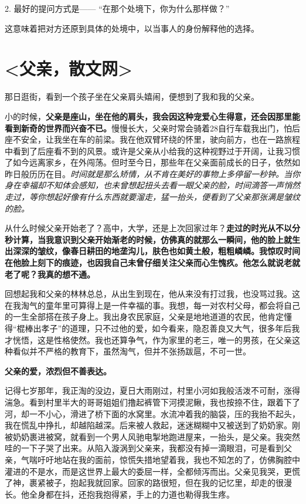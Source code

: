\documentclass[UTF8,a4paper,8pt]{ctexbook}
\begin{document}
		2. 最好的提问方式是——
		“在那个处境下，你为什么那样做？”
		
		这意味着把对方还原到具体的处境中，以当事人的身份解释他的选择。

\newpage
\section{<父亲，散文网>}
		那日逛街，看到一个孩子坐在父亲肩头嬉闹，便想到了我和我的父亲。
		
		小的时候，\textbf{父亲是座山，坐在他的肩头，我会因这种宠爱心生得意，还会因那里能看到新奇的世界而兴奋不已。}慢慢长大，父亲时常会骑着28自行车载我出门，怕后座不安全，让我坐在车的前梁。我在他双臂环绕的怀里，驶向前方，也在一路旅程中看到了后座看不到的风景。或许是父亲从小给我的这种视野过于开阔，让我习惯了如今远离家乡，在外闯荡。但时至今日，那些年在父亲面前成长的日子，依然如昨日般历历在目。\textit{时间就是那么矫情，从不肯在美好的事物上多停留一秒钟。当你身在幸福却不知体会感知，也未曾想起扭头去看一眼父亲的脸，时间滴答一声悄然走过，等你想起好像有什么东西就要溜走，猛一抬头，便看到了父亲那张满是皱纹的脸。}
		
		从什么时候父亲开始老了？高中，大学，还是上次回家过年？\textbf{走过的时光从不以分秒计算，当我意识到父亲开始渐老的时候，仿佛真的就那么一瞬间，他的脸上就生出深深的皱纹，像春日耕田的地垄沟儿，肤色也如黄土般，粗粗嶙嶙。我惊叹时间在他脸上刻下的痕迹，也因我自己未曾仔细关注父亲而心生愧疚。他怎么就说老就老了呢？我真的想不通。}
		
		回想起我和父亲的林林总总，从出生到现在，他从来没有打过我，也没骂过我。这在我淘气的童年里可算得上是一件幸福的事。我想，每一对农村父母，都会将自己的一生全部搭在孩子身上。我出身农民家庭，父亲是地地道道的农民，他肯定懂得“棍棒出孝子”的道理，只不过他的爱，如今看来，隐忍善良又大气，很多年后我才恍悟，这是性格使然。我也还算争气，作为家里的老三，唯一的男孩，在父亲这种看似并不严格的教育下，虽然淘气，但并不张扬跋扈，不可一世。
		
		\textbf{父亲的爱，浓烈但不善表达。}
		
		记得七岁那年，我正淘的没边，夏日大雨刚过，村里小河如我般活泼不可耐，涨得湍急。看到村里半大的哥哥姐姐们撸起裤管下河摸泥鳅，我也按捺不住，跟着下了河，却一不小心，滑进了桥下面的水窝里。水流冲着我的脑袋，压的我抬不起头，我在慌乱中挣扎，却越陷越深。后来被人救起，迷迷糊糊中又被送到了奶奶家。刚被奶奶裹进被窝，就看到一个男人风驰电掣地跑进屋来，一抬头，是父亲。我突然哇的一下子哭了出来。从陷入漩涡到父亲来，我都没有掉一滴眼泪，可是看到父亲，气喘吁吁地站在我的面前，惊慌失措地望着我，我也不知怎的了，仿佛胸腔中灌进的不是水，而是这世界上最大的委屈一样，全都倾泻而出。父亲见我哭，更慌了神，裹紧被子，抱起我就回家。回家的路很短，但在我的记忆里，却走的很漫长。他全身都在抖，还抱我抱得紧，手上的力道也勒得我生疼。 
		
\end{document}
